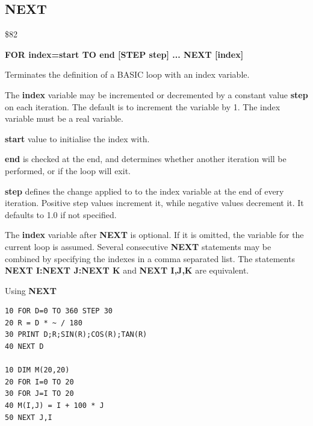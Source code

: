 \subsection{NEXT}
\begin{description}[leftmargin=2cm,style=nextline]
\item [Token:] \$82
\item [Format:] {\bf FOR index=start TO end [STEP step] ... NEXT [index]}
\item [Usage:] Terminates the definition
               of a BASIC loop with an index variable.

               The {\bf index} variable may be incremented or decremented
               by a constant value {\bf step} on each iteration. The default
               is to increment the variable by 1.
               The index variable must be a real variable.

               {\bf start} value to initialise the index with.

               {\bf end} is checked at the end,
               and determines whether another iteration will be performed,
               or if the loop will exit.

               {\bf step} defines the change applied to
               to the index variable at the end of every iteration.
               Positive step values increment it, while negative values
               decrement it. It defaults to 1.0 if not specified.

\item [Remarks:] The {\bf index} variable after {\bf NEXT} is
               optional. If it is omitted, the variable
               for the current loop is assumed.
               Several consecutive {\bf NEXT} statements may be
               combined by specifying the indexes in a comma
               separated list. The statements
               {\bf NEXT I:NEXT J:NEXT K} and
               {\bf NEXT I,J,K} are equivalent.

\item [Example:] Using {\bf NEXT}
\begin{tcolorbox}[colback=black,coltext=white]
\verbatimfont{\codefont}
\begin{verbatim}
10 FOR D=0 TO 360 STEP 30
20 R = D * ~ / 180
30 PRINT D;R;SIN(R);COS(R);TAN(R)
40 NEXT D

10 DIM M(20,20)
20 FOR I=0 TO 20
30 FOR J=I TO 20
40 M(I,J) = I + 100 * J
50 NEXT J,I
\end{verbatim}
\end{tcolorbox}
\end{description}

